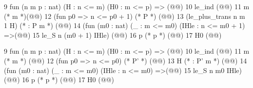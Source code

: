 9  fun (n m p : nat) (H : n <= m) (H0 : m <= p) =>  (@\vspace{-0.05cm}@)
10   le_ind  (@\vspace{-0.05cm}@)
11     m                             (* m *)(@\vspace{-0.05cm}@)
12     (fun p0 => n <= p0 + 1)       (* P *) (@\vspace{-0.05cm}@)
13     (le_plus_trans n m 1 H)       (* : P m *) (@\vspace{-0.05cm}@)
14     (fun (m0 : nat) (_ : m <= m0) (IHle : n <= m0 + 1) =>(@\vspace{-0.05cm}@)
15       le_S n (m0 + 1) IHle) (@\vspace{-0.05cm}@)
16     p                             (* p *) (@\vspace{-0.05cm}@)
17     H0  (@\vspace{-0.05cm}@)

9  fun (n m p : nat) (H : n <= m) (H0 : m <= p) =>  (@\vspace{-0.05cm}@)
10   le_ind  (@\vspace{-0.05cm}@)
11     m                         (* m *) (@\vspace{-0.05cm}@)
12     (fun p0 => n <= p0)       (* P' *) (@\vspace{-0.05cm}@)
13     H                         (* : P' m *) (@\vspace{-0.05cm}@) 
14     (fun (m0 : nat) (_ : m <= m0) (IHle : n <= m0) =>(@\vspace{-0.05cm}@)
15       le_S n m0 IHle) (@\vspace{-0.05cm}@)
16     p                         (* p *) (@\vspace{-0.05cm}@)
17     H0  (@\vspace{-0.05cm}@)
